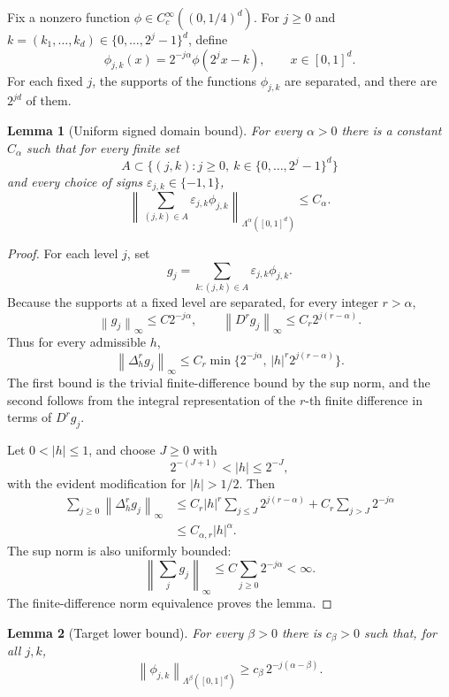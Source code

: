 \documentclass[11pt]{article}
\newtheorem{lemma}{Lemma}
\newcommand{\eps}{\varepsilon}
\newcommand{\Lam}{\Lambda}
\newcommand{\norm}[1]{\left\lVert #1\right\rVert}
\newcommand{\abs}[1]{\left\lvert #1\right\rvert}
\begin{document}
Fix a nonzero function \(\phi\in C_c^\infty((0,1/4)^d)\). For
\(j\ge0\) and \(k=(k_1,\ldots,k_d)\in\{0,\ldots,2^j-1\}^d\), define
\[
  \phi_{j,k}(x)=2^{-j\alpha}\phi(2^j x-k),
  \qquad x\in[0,1]^d.
\]
For each fixed \(j\), the supports of the functions \(\phi_{j,k}\) are
separated, and there are \(2^{jd}\) of them.

\begin{lemma}[Uniform signed domain bound]\label{lem:domain}
For every \(\alpha>0\) there is a constant \(C_\alpha\) such that for every
finite set
\[
  A\subset\{(j,k):j\ge0,\ k\in\{0,\ldots,2^j-1\}^d\}
\]
and every choice of signs \(\eps_{j,k}\in\{-1,1\}\),
\[
  \left\|
    \sum_{(j,k)\in A}\eps_{j,k}\phi_{j,k}
  \right\|_{\Lam^\alpha([0,1]^d)}
  \le C_\alpha .
\]
\end{lemma}

\begin{proof}
For each level \(j\), set
\[
  g_j=\sum_{k:(j,k)\in A}\eps_{j,k}\phi_{j,k}.
\]
Because the supports at a fixed level are separated, for every integer
\(r>\alpha\),
\[
  \norm{g_j}_\infty\le C2^{-j\alpha},
  \qquad
  \norm{D^r g_j}_\infty\le C_r2^{j(r-\alpha)}.
\]
Thus for every admissible \(h\),
\[
  \norm{\Delta_h^r g_j}_\infty
  \le
  C_r\min\{2^{-j\alpha},\,\abs h^r2^{j(r-\alpha)}\}.
\]
The first bound is the trivial finite-difference bound by the sup norm, and
the second follows from the integral representation of the \(r\)-th finite
difference in terms of \(D^r g_j\).

Let \(0<\abs h\le1\), and choose \(J\ge0\) with
\[
  2^{-(J+1)}<\abs h\le2^{-J},
\]
with the evident modification for \(\abs h>1/2\). Then
\[
\begin{aligned}
  \sum_{j\ge0}\norm{\Delta_h^r g_j}_\infty
  &\le
  C_r\abs h^r\sum_{j\le J}2^{j(r-\alpha)}
  +C_r\sum_{j>J}2^{-j\alpha}  \\
  &\le C_{\alpha,r}\abs h^\alpha .
\end{aligned}
\]
The sup norm is also uniformly bounded:
\[
  \left\|\sum_j g_j\right\|_\infty
  \le C\sum_{j\ge0}2^{-j\alpha}<\infty .
\]
The finite-difference norm equivalence proves the lemma.
\end{proof}

\begin{lemma}[Target lower bound]\label{lem:target}
For every \(\beta>0\) there is \(c_\beta>0\) such that, for all \(j,k\),
\[
  \norm{\phi_{j,k}}_{\Lam^\beta([0,1]^d)}
  \ge c_\beta\,2^{-j(\alpha-\beta)}.
\]
\end{lemma}
\end{document}
